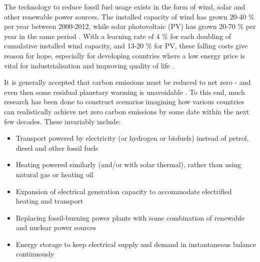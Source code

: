 \documentclass[report_18month.tex]{subfiles}
\begin{document}
The technology to reduce fossil fuel usage exists in the form of wind, solar and other renewable power sources. The installed capacity of wind has grown 20-40 \% per year between 2000-2012, while solar photovoltaic (PV) has grown 20-70 \% per year in the same period \cite{carbajales2014storage}. With a learning rate of 4 \% for each doubling of cumulative installed wind capacity, and 13-20 \% for PV, these falling costs give reason for hope, especially for developing countries where a low energy price is vital for industrialisation and improving quality of life \cite{tol2017socialcost}.

It is generally accepted that carbon emissions must be reduced to net zero - and even then some residual planetary warming is unavoidable \cite{frolicher2014co2}. To this end, much research has been done to construct scenarios imagining how various countries can realistically achieve net zero carbon emissions by some date within the next few decades. \cite{sluisveld2016nweu,eu2011roadmap2050,chai2014modeling,ccc2008} These invariably include:
\begin{itemize}
\item Transport powered by electricity (or hydrogen or biofuels) instead of petrol, diesel and other fossil fuels
\item Heating powered similarly (and/or with solar thermal), rather than using natural gas or heating oil
\item Expansion of electrical generation capacity to accommodate electrified heating and transport
\item Replacing fossil-burning power plants with some combination of renewable and nuclear power sources
\item Energy storage to keep electrical supply and demand in instantaneous balance continuously
\end{itemize}
\end{document}
